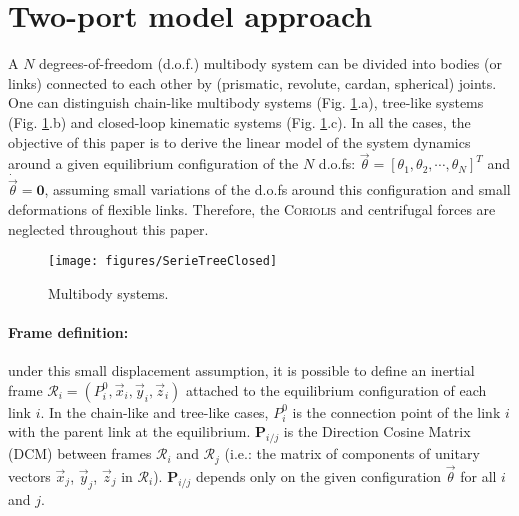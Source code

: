 \section{Two-port model approach}\label{sect:1}
A $N$ degrees-of-freedom (d.o.f.) multibody system can be divided into bodies (or links) connected to each other by (prismatic, revolute, cardan, spherical) joints. One can distinguish chain-like multibody systems (Fig. \ref{fig:SerieTreeClosed}.a), tree-like systems  (Fig. \ref{fig:SerieTreeClosed}.b) and closed-loop kinematic systems  (Fig. \ref{fig:SerieTreeClosed}.c). In all the cases, the objective of this paper is to derive the linear model of the system dynamics around a given equilibrium configuration of the $N$ d.o.fs: $\vec{\theta}=[\theta_1,\theta_2,\cdots,\theta_N]^T$ and  $\dot{\vec{\theta}}=\mathbf{0}$, assuming small variations of the d.o.fs around this configuration and small deformations of flexible links. Therefore, the \textsc{Coriolis} and centrifugal forces are neglected throughout this paper.
\begin{figure}[htbp!]
  \texttt{[image: figures/SerieTreeClosed]}
\caption{Multibody systems.}
\label{fig:SerieTreeClosed} 
\end{figure}


\paragraph{Frame definition:}
 under this small displacement assumption, it is possible to define an inertial frame $\mathcal{R}_i=(P_i^0,\vec{x}_i,\vec{y}_i,\vec{z}_i)$ attached to the equilibrium configuration of each link $i$. In the chain-like and tree-like cases, $P_i^0$ is the connection point of the link $i$ with the parent link at the equilibrium. 
 $\mathbf{P}_{i/j}$ is the Direction Cosine Matrix (DCM)
between frames $\mathcal{R}_i$ and $\mathcal{R}_j$ (i.e.: the matrix of components of unitary vectors $\vec{x}_j$, $\vec{y}_j$, $\vec{z}_j$ in $\mathcal{R}_i$). $\mathbf{P}_{i/j}$ depends only on the given configuration $\vec{\theta}$ for all $i$ and $j$.

